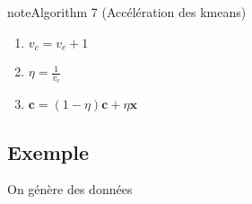 \documentclass[letterpaper,10pt,french]{sphinxmanual}
\begin{document}
\begin{sphinxadmonition}{note}{Algorithm 7 (Accélération des k\sphinxhyphen{}means)}
\begin{enumerate}
\begin{enumerate}
\begin{enumerate}
\item {} 
\sphinxAtStartPar
\(v_c = v_c + 1\)

\item {} 
\sphinxAtStartPar
\(\eta = \frac{1}{v_c}\)

\item {} 
\sphinxAtStartPar
\(\mathbf c = (1-\eta)\mathbf c + \eta \mathbf x\)

\end{enumerate}

\end{enumerate}

\end{enumerate}
\end{sphinxadmonition}


\subsection{Exemple}
\label{\detokenize{clustering:id3}}
\sphinxAtStartPar
On génère des données
\end{document}
